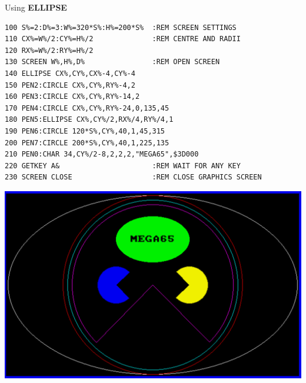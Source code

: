 \begin{description}[leftmargin=2cm,style=nextline]
\item [Example:] Using {\bf ELLIPSE}

\begin{tcolorbox}[colback=black,coltext=white]
\verbatimfont{\codefont}
\begin{verbatim}
100 S%=2:D%=3:W%=320*S%:H%=200*S%  :REM SCREEN SETTINGS
110 CX%=W%/2:CY%=H%/2              :REM CENTRE AND RADII
120 RX%=W%/2:RY%=H%/2
130 SCREEN W%,H%,D%                :REM OPEN SCREEN
140 ELLIPSE CX%,CY%,CX%-4,CY%-4
150 PEN2:CIRCLE CX%,CY%,RY%-4,2
160 PEN3:CIRCLE CX%,CY%,RY%-14,2
170 PEN4:CIRCLE CX%,CY%,RY%-24,0,135,45
180 PEN5:ELLIPSE CX%,CY%/2,RX%/4,RY%/4,1
190 PEN6:CIRCLE 120*S%,CY%,40,1,45,315
200 PEN7:CIRCLE 200*S%,CY%,40,1,225,135
210 PEN0:CHAR 34,CY%/2-8,2,2,2,"MEGA65",$3D000
220 GETKEY A&                      :REM WAIT FOR ANY KEY
230 SCREEN CLOSE                   :REM CLOSE GRAPHICS SCREEN
\end{verbatim}
\end{tcolorbox}

\item \begin{center}\includegraphics[width=0.7\linewidth]{images/ellipse.png}\end{center}

\end{description}

\newpage
